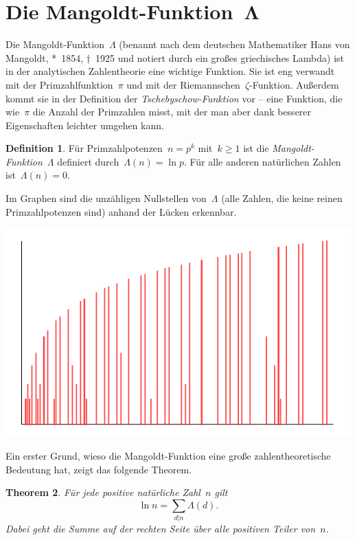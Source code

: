 \documentclass[twoside]{../zirkelblatt1415}
\theoremstyle{definition}
\newtheorem{defn}{Definition}[section]
\theoremstyle{plain}
\newtheorem{thm}[defn]{Theorem}
\theoremstyle{remark}
\begin{document}
\section{\texorpdfstring{Die Mangoldt-Funktion~$\boldsymbol{\Lambda}$}{Die
Mangoldt-Funktion~Λ}}

Die Mangoldt-Funktion~$\Lambda$ (benannt nach dem deutschen Mathematiker Hans
von Mangoldt, *~1854, †~1925 und notiert durch ein großes griechisches Lambda)
ist in der analytischen Zahlentheorie eine wichtige Funktion. Sie ist eng
verwandt mit der Primzahlfunktion~$\pi$ und mit der
Riemannschen~$\zeta$-Funktion. Außerdem kommt sie in der Definition der
\emph{Tschebyschow-Funktion} vor -- eine Funktion, die wie~$\pi$ die Anzahl der
Primzahlen misst, mit der man aber dank besserer Eigenschaften leichter umgehen
kann.

\begin{defn}Für Primzahlpotenzen~$n = p^k$ mit~$k \geq 1$ ist die
\emph{Mangoldt-Funktion}~$\Lambda$ definiert durch~$\Lambda(n) = \ln p$. Für
alle anderen natürlichen Zahlen ist~$\Lambda(n) = 0$.\end{defn}

Im Graphen sind die unzähligen Nullstellen von~$\Lambda$ (alle Zahlen, die
keine reinen Primzahlpotenzen sind) anhand der Lücken erkennbar.

\begin{center}
  \includegraphics{mangoldt-function}
\end{center}

Ein erster Grund, wieso die Mangoldt-Funktion eine große zahlentheoretische
Bedeutung hat, zeigt das folgende Theorem.

\begin{thm}\label{thm:mangoldt-hauptsatz}Für jede positive natürliche Zahl~$n$
gilt
\[ \ln n = \sum_{d|n} \Lambda(d). \]
Dabei geht die Summe auf der rechten Seite über alle positiven Teiler von~$n$.
\end{thm}
\end{document}
